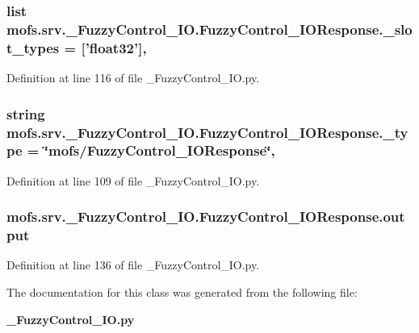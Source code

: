 \subsubsection[{\-\_\-slot\-\_\-types}]{\setlength{\rightskip}{0pt plus 5cm}list mofs.\-srv.\-\_\-\-Fuzzy\-Control\-\_\-\-I\-O.\-Fuzzy\-Control\-\_\-\-I\-O\-Response.\-\_\-slot\-\_\-types = ['float32']\hspace{0.3cm}{\ttfamily [static]}, {\ttfamily [private]}}\label{classmofs_1_1srv_1_1__FuzzyControl__IO_1_1FuzzyControl__IOResponse_a90119b51240aff2a66e2bebc9cc4e9de}


Definition at line 116 of file \-\_\-\-Fuzzy\-Control\-\_\-\-I\-O.\-py.

\subsubsection[{\-\_\-type}]{\setlength{\rightskip}{0pt plus 5cm}string mofs.\-srv.\-\_\-\-Fuzzy\-Control\-\_\-\-I\-O.\-Fuzzy\-Control\-\_\-\-I\-O\-Response.\-\_\-type = \char`\"{}mofs/{\bf Fuzzy\-Control\-\_\-\-I\-O\-Response}\char`\"{}\hspace{0.3cm}{\ttfamily [static]}, {\ttfamily [private]}}\label{classmofs_1_1srv_1_1__FuzzyControl__IO_1_1FuzzyControl__IOResponse_a88e212ff3924178893427c2143e512f7}


Definition at line 109 of file \-\_\-\-Fuzzy\-Control\-\_\-\-I\-O.\-py.

\subsubsection[{output}]{\setlength{\rightskip}{0pt plus 5cm}mofs.\-srv.\-\_\-\-Fuzzy\-Control\-\_\-\-I\-O.\-Fuzzy\-Control\-\_\-\-I\-O\-Response.\-output}\label{classmofs_1_1srv_1_1__FuzzyControl__IO_1_1FuzzyControl__IOResponse_a348ed3b41b66440928a313a0d3b7c986}


Definition at line 136 of file \-\_\-\-Fuzzy\-Control\-\_\-\-I\-O.\-py.



The documentation for this class was generated from the following file\-:\begin{DoxyCompactItemize}
\item 
{\bf \-\_\-\-Fuzzy\-Control\-\_\-\-I\-O.\-py}\end{DoxyCompactItemize}
